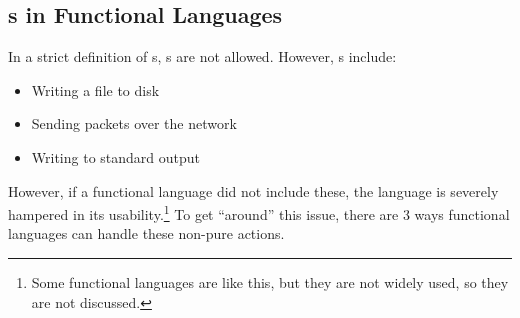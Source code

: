 \subsection{s in Functional Languages}\label{subsec:Functional_Function_Side_Effects}
In a strict definition of s, s are not allowed.
However, s include:
\begin{itemize}[noitemsep]
\item Writing a file to disk
\item Sending packets over the network
\item Writing to standard output
\end{itemize}

However, if a functional language did not include these, the language is severely hampered in its usability.\footnote{Some functional languages are like this, but they are not widely used, so they are not discussed.}
To get ``around'' this issue, there are 3 ways functional languages can handle these non-pure actions.
